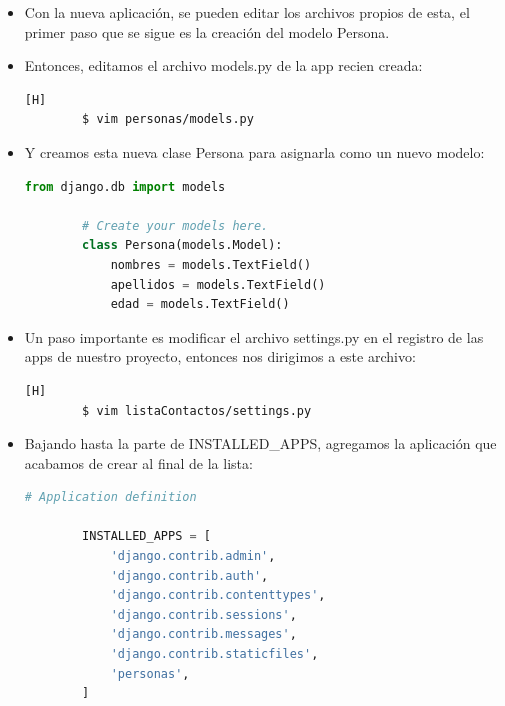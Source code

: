\documentclass{article}
\begin{document}
        \begin{itemize}
            \item Con la nueva aplicación, se pueden editar los archivos propios de esta, el primer paso que se sigue es la creación del modelo Persona.
            \item Entonces, editamos el archivo models.py de la app recien creada:
        
        \begin{lstlisting}[language=bash,caption={Ingresando a models.py}][H]
        $ vim personas/models.py
        \end{lstlisting}

            \item Y creamos esta nueva clase Persona para asignarla como un nuevo modelo:
        
        \begin{lstlisting}[language=Python, caption={Modelo Persona}]
        from django.db import models
    
        # Create your models here.
        class Persona(models.Model):
            nombres = models.TextField()
            apellidos = models.TextField()
            edad = models.TextField()
        \end{lstlisting}
        
            \item Un paso importante es modificar el archivo settings.py en el registro de las apps de nuestro proyecto, entonces nos dirigimos a este archivo:

        \begin{lstlisting}[language=bash,caption={Ingresando a settings.py}][H]
        $ vim listaContactos/settings.py
        \end{lstlisting}
            \item Bajando hasta la parte de INSTALLED\_APPS, agregamos la aplicación que acabamos de crear al final de la lista:
        \begin{lstlisting}[language=Python, caption={Aplicaciones del proyecto}]
        # Application definition
    
        INSTALLED_APPS = [
            'django.contrib.admin',
            'django.contrib.auth',
            'django.contrib.contenttypes',
            'django.contrib.sessions',
            'django.contrib.messages',
            'django.contrib.staticfiles',
            'personas',
        ]
        \end{lstlisting}
        

\end{itemize}
\end{document}
